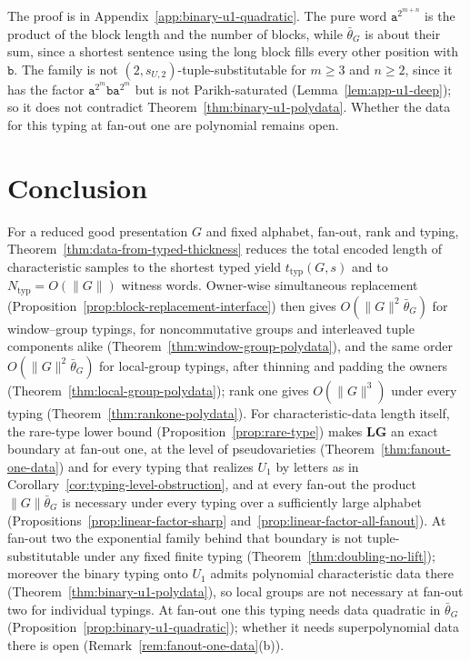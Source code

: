 \documentclass[11pt]{article}
\numberwithin{equation}{section}
\theoremstyle{plain}
\theoremstyle{definition}
\theoremstyle{remark}
\begin{document}
The proof is in Appendix~\ref{app:binary-u1-quadratic}.  The pure word
$\mathtt a^{2^{m+n}}$ is the product of the block length and the number of
blocks, while $\bar\theta_G$ is about their sum, since a shortest sentence using
the long block fills every other position with $\mathtt b$.  The family is not
$(2,s_{U,2})$-tuple-substitutable for $m\ge3$ and $n\ge2$, since it has the factor
$\mathtt a^{2^m}\mathtt b\mathtt a^{2^m}$ but is not Parikh-saturated
(Lemma~\ref{lem:app-u1-deep}); so it does not contradict
Theorem~\ref{thm:binary-u1-polydata}.  Whether the data for this typing at
fan-out one are polynomial remains open.

\section{Conclusion}
\label{sec:conclusion}

For a reduced good presentation $G$ and fixed alphabet, fan-out, rank and typing,
Theorem~\ref{thm:data-from-typed-thickness} reduces the total encoded length of
characteristic samples to the shortest typed yield $t_{\mathrm{typ}}(G,s)$ and to
$N_{\mathrm{typ}}=O(\|G\|)$ witness words.  Owner-wise simultaneous replacement
(Proposition~\ref{prop:block-replacement-interface}) then gives
$O(\|G\|^2\bar\theta_G)$ for window--group typings, for noncommutative groups and
interleaved tuple components alike (Theorem~\ref{thm:window-group-polydata}), and
the same order $O(\|G\|^2\bar\theta_G)$ for local-group typings, after thinning
and padding the owners (Theorem~\ref{thm:local-group-polydata}); rank one gives $O(\|G\|^3)$ under every
typing (Theorem~\ref{thm:rankone-polydata}).  For characteristic-data length itself,
the rare-type lower bound (Proposition~\ref{prop:rare-type}) makes $\mathbf{LG}$ an
exact boundary at fan-out one, at the level of pseudovarieties
(Theorem~\ref{thm:fanout-one-data}) and for every typing that realizes $U_1$ by
letters as in Corollary~\ref{cor:typing-level-obstruction}, and at every fan-out the product
$\|G\|\bar\theta_G$ is necessary under every typing over a sufficiently large
alphabet (Propositions~\ref{prop:linear-factor-sharp}
and~\ref{prop:linear-factor-all-fanout}).  At fan-out two the exponential family behind
that boundary is not tuple-substitutable under any fixed finite typing
(Theorem~\ref{thm:doubling-no-lift}); moreover the binary typing onto $U_1$
admits polynomial characteristic data there
(Theorem~\ref{thm:binary-u1-polydata}), so local groups are not necessary at
fan-out two for individual typings.  At fan-out one this typing needs data
quadratic in $\bar\theta_G$ (Proposition~\ref{prop:binary-u1-quadratic}); whether it
needs superpolynomial data there is open (Remark~\ref{rem:fanout-one-data}(b)).
\end{document}
